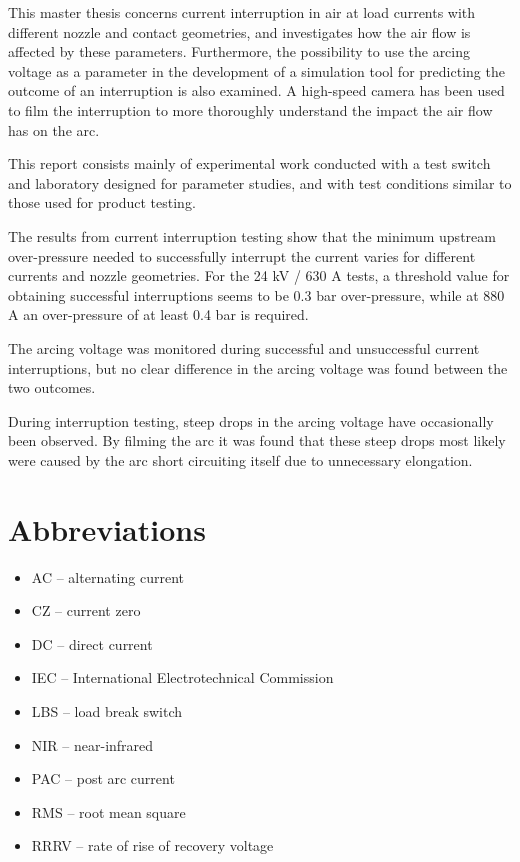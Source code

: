 \documentclass[10pt,b5paper,twoside]{article}
\begin{document}
This master thesis concerns current interruption in air at load currents with different nozzle and contact geometries, and investigates how the air flow is affected by these parameters. Furthermore, the possibility to use the arcing voltage as a parameter in the development of a simulation tool for predicting the outcome of an interruption is also examined. A high-speed camera has been used to film the interruption to more thoroughly understand the impact the air flow has on the arc.

This report consists mainly of experimental work conducted with a test switch and laboratory designed for parameter studies, and with test conditions similar to those used for product testing.

The results from current interruption testing show that the minimum upstream over-pressure needed to successfully interrupt the current varies for different currents and nozzle geometries. For the 24 kV / 630 A tests, a threshold value for obtaining successful interruptions seems to be 0.3 bar over-pressure, while at 880 A an over-pressure of at least 0.4 bar is required.

The arcing voltage was monitored during successful and unsuccessful current interruptions, but no clear difference in the arcing voltage was found between the two outcomes. 

During interruption testing, steep drops in the arcing voltage have occasionally been observed. By filming the arc it was found that these steep drops most likely were caused by the arc short circuiting itself due to unnecessary elongation.

\cleardoublepage
\setcounter{page}{1}
\tableofcontents

\cleardoublepage
\section*{Abbreviations}

\begin{itemize}
\item[] AC -- alternating current
\item[] CZ -- current zero
\item[] DC -- direct current
\item[] IEC -- International Electrotechnical Commission
\item[] LBS -- load break switch
\item[] NIR -- near-infrared
\item[] PAC -- post arc current
\item[] RMS -- root mean square
\item[] RRRV -- rate of rise of recovery voltage
\end{itemize}
\end{document}
